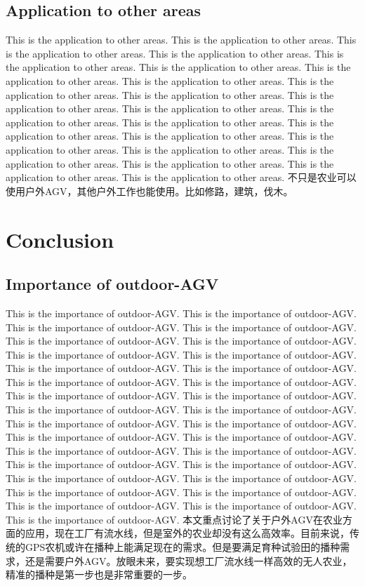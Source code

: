\documentclass[12pt]{article}
\begin{document}
\begin{flushleft}
\subsection{Application to other areas}
This is the application to other areas. This is the application to other areas. This is the application to other areas. This is the application to other areas. This is the application to other areas. This is the application to other areas. This is the application to other areas. This is the application to other areas. This is the application to other areas. This is the application to other areas. This is the application to other areas. This is the application to other areas. This is the application to other areas. This is the application to other areas. This is the application to other areas. This is the application to other areas. This is the application to other areas. This is the application to other areas. This is the application to other areas. This is the application to other areas. This is the application to other areas. This is the application to other areas. 
不只是农业可以使用户外AGV，其他户外工作也能使用。比如修路，建筑，伐木。

\section{Conclusion}

\subsection{Importance of outdoor-AGV}
This is the importance of outdoor-AGV. This is the importance of outdoor-AGV. This is the importance of outdoor-AGV. This is the importance of outdoor-AGV. This is the importance of outdoor-AGV. This is the importance of outdoor-AGV. This is the importance of outdoor-AGV. This is the importance of outdoor-AGV. This is the importance of outdoor-AGV. This is the importance of outdoor-AGV. This is the importance of outdoor-AGV. This is the importance of outdoor-AGV. This is the importance of outdoor-AGV. This is the importance of outdoor-AGV. This is the importance of outdoor-AGV. This is the importance of outdoor-AGV. This is the importance of outdoor-AGV. This is the importance of outdoor-AGV. This is the importance of outdoor-AGV. This is the importance of outdoor-AGV. This is the importance of outdoor-AGV. This is the importance of outdoor-AGV. This is the importance of outdoor-AGV. This is the importance of outdoor-AGV. This is the importance of outdoor-AGV. This is the importance of outdoor-AGV. This is the importance of outdoor-AGV. This is the importance of outdoor-AGV. This is the importance of outdoor-AGV. This is the importance of outdoor-AGV. This is the importance of outdoor-AGV. 
本文重点讨论了关于户外AGV在农业方面的应用，现在工厂有流水线，但是室外的农业却没有这么高效率。目前来说，传统的GPS农机或许在播种上能满足现在的需求。但是要满足育种试验田的播种需求，还是需要户外AGV。放眼未来，要实现想工厂流水线一样高效的无人农业，精准的播种是第一步也是非常重要的一步。


\end{flushleft}
\end{document}
